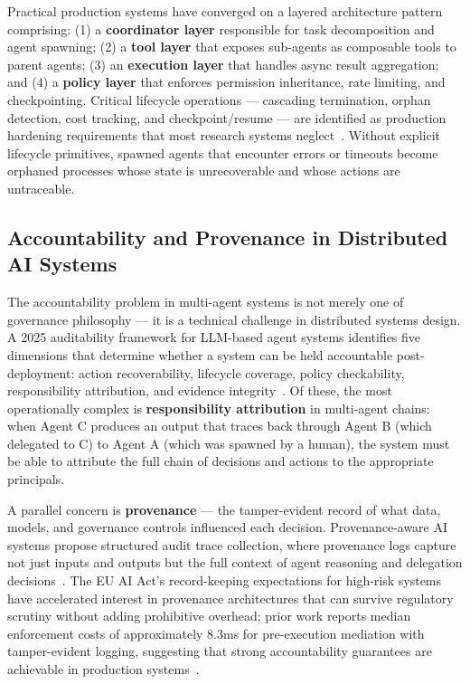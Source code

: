 Practical production systems have converged on a layered architecture pattern~\cite{multi-agent-architecture} comprising: (1) a \textbf{coordinator layer} responsible for task decomposition and agent spawning; (2) a \textbf{tool layer} that exposes sub-agents as composable tools to parent agents; (3) an \textbf{execution layer} that handles async result aggregation; and (4) a \textbf{policy layer} that enforces permission inheritance, rate limiting, and checkpointing. Critical lifecycle operations — cascading termination, orphan detection, cost tracking, and checkpoint/resume — are identified as production hardening requirements that most research systems neglect~\cite{production-hardening}. Without explicit lifecycle primitives, spawned agents that encounter errors or timeouts become orphaned processes whose state is unrecoverable and whose actions are untraceable.

\subsection{Accountability and Provenance in Distributed AI Systems}

The accountability problem in multi-agent systems is not merely one of governance philosophy — it is a technical challenge in distributed systems design. A 2025 auditability framework for LLM-based agent systems identifies five dimensions that determine whether a system can be held accountable post-deployment: action recoverability, lifecycle coverage, policy checkability, responsibility attribution, and evidence integrity~\cite{auditability-framework}. Of these, the most operationally complex is \textbf{responsibility attribution} in multi-agent chains: when Agent C produces an output that traces back through Agent B (which delegated to C) to Agent A (which was spawned by a human), the system must be able to attribute the full chain of decisions and actions to the appropriate principals.

A parallel concern is \textbf{provenance} — the tamper-evident record of what data, models, and governance controls influenced each decision. Provenance-aware AI systems propose structured audit trace collection, where provenance logs capture not just inputs and outputs but the full context of agent reasoning and delegation decisions~\cite{provenance-question}. The EU AI Act's record-keeping expectations for high-risk systems have accelerated interest in provenance architectures that can survive regulatory scrutiny without adding prohibitive overhead; prior work reports median enforcement costs of approximately 8.3ms for pre-execution mediation with tamper-evident logging, suggesting that strong accountability guarantees are achievable in production systems~\cite{auditability-framework}.

